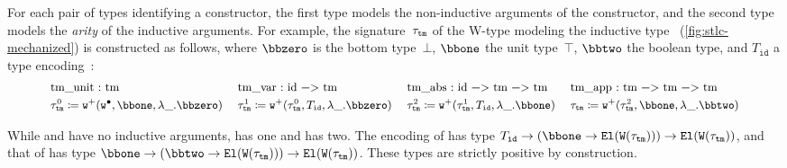For each pair of types identifying a constructor, the first type models
the non-inductive arguments of the constructor, and the second type models the \emph{arity}
of the inductive arguments.
For example, the signature~$\tau_{\texttt{tm}}$ of the W-type modeling
the inductive type~ (\cref{fig:stlc-mechanized})
is constructed as follows,
where $\bbzero$ is the bottom type~$\bot$, $\bbone$ the unit type~$\top$, $\bbtwo$ the boolean type,
and $T_{\texttt{id}}$ a type encoding~:
%
\begin{align*}
\small
\begin{tabular}{@{}llll@{}}
\lsti!tm_unit : tm!
&
\lsti!tm_var : id -> tm!
&
\lsti!tm_abs : id -> tm -> tm!
&
\lsti!tm_app : tm -> tm -> tm!
\smallskip\\
$\wsig_{\texttt{tm}}^0 \coloneq \WSigAdd{\WSigEmp}{\bbone}{\lambda \_ . \bbzero}$ 
& $\wsig_{\texttt{tm}}^1 \coloneq \WSigAdd{\wsig_{\texttt{tm}}^0}{T_{\texttt{id}}}{\lambda \_ . \bbzero}$
& $\wsig_{\texttt{tm}}^2 \coloneq \WSigAdd{\wsig_{\texttt{tm}}^1}{T_{\texttt{id}}}{\lambda \_ .\bbone} $ 
& $\wsig_{\texttt{tm}} \coloneq \WSigAdd{\wsig_{\texttt{tm}}^2}{\bbone}{\lambda \_ .\bbtwo}$
\end{tabular}
\end{align*}

\noindent
While  and  have no inductive arguments,
 has one and  has two.
The encoding of  has type
$T_{\texttt{id}} \to (\bbone \to \El{\wcode{\wsig_{\texttt{tm}}}}) \to \El{\wcode{\wsig_{\texttt{tm}}}}$,
and that of  has type
$\bbone \to (\bbtwo \to \El{\wcode{\wsig_{\texttt{tm}}}}) \to \El{\wcode{\wsig_{\texttt{tm}}}}$.
These types are strictly positive by construction.

